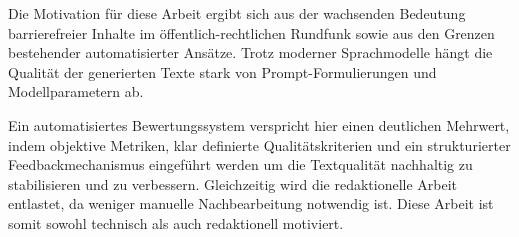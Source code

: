 Die Motivation für diese Arbeit ergibt sich aus der wachsenden Bedeutung barrierefreier Inhalte im öffentlich-rechtlichen Rundfunk sowie aus den Grenzen bestehender automatisierter Ansätze. Trotz moderner Sprachmodelle hängt die Qualität der generierten Texte stark von Prompt-Formulierungen und Modellparametern ab.

Ein automatisiertes Bewertungssystem verspricht hier einen deutlichen Mehrwert, indem objektive Metriken, klar definierte Qualitätskriterien und ein strukturierter Feedbackmechanismus eingeführt werden um die Textqualität nachhaltig zu stabilisieren und zu verbessern. Gleichzeitig wird die redaktionelle Arbeit entlastet, da weniger manuelle Nachbearbeitung notwendig ist. Diese Arbeit ist somit sowohl technisch als auch redaktionell motiviert.